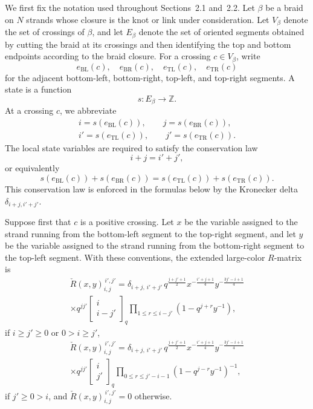 \documentclass[twocolumn]{article}
\begin{document}
We first fix the notation used throughout Sections~2.1 and~2.2.  Let $\beta$ be
a braid on $N$ strands whose closure is the knot or link under consideration.
Let $V_\beta$ denote the set of crossings of $\beta$, and let $E_\beta$ denote
the set of oriented segments obtained by cutting the braid at its crossings and
then identifying the top and bottom endpoints according to the braid closure.
For a crossing $c\in V_\beta$, write
\[
  e_{\mathrm{BL}}(c),\quad e_{\mathrm{BR}}(c),\quad
  e_{\mathrm{TL}}(c),\quad e_{\mathrm{TR}}(c)
\]
for the adjacent bottom-left, bottom-right, top-left, and top-right segments.
A state is a function
\[
  s:E_\beta\to \mathbb Z.
\]
At a crossing $c$, we abbreviate
\[
  \begin{split}
  i=s(e_{\mathrm{BL}}(c)),\qquad
  j=s(e_{\mathrm{BR}}(c)),\\
  i'=s(e_{\mathrm{TL}}(c)),\qquad
  j'=s(e_{\mathrm{TR}}(c)).
  \end{split}
\]
The local state variables are required to satisfy the conservation law
\begin{equation}\label{eq:state-conservation}
  i+j=i'+j',
\end{equation}
or equivalently
\[
  s(e_{\mathrm{BL}}(c))+s(e_{\mathrm{BR}}(c))
  =
  s(e_{\mathrm{TL}}(c))+s(e_{\mathrm{TR}}(c)).
\]
This conservation law is enforced in the formulas below by the Kronecker delta
\(\delta_{i+j,i'+j'}\).

Suppose first that $c$ is a positive crossing.  Let $x$ be the variable assigned
to the strand running from the bottom-left segment to the top-right segment,
and let $y$ be the variable assigned to the strand running from the bottom-right
segment to the top-left segment.  With these conventions, the extended
large-color $R$-matrix is
\begin{multline}\label{eq:positive-rmatrix-1}
\check{R}(x,y)^{\,i',j'}_{i,j}=
\delta_{i+j,\,i'+j'}\,
q^{\frac{j+j'+1}{2}}
 x^{-\frac{i'+j+1}{4}}
 y^{-\frac{3j'-i+1}{4}}
  \\
\times q^{jj'}\begin{bmatrix} i \\ i-j' \end{bmatrix}_q
\prod_{1\le r\le i-j'}\left(1-q^{j+r}y^{-1}\right),
\end{multline}
if \(i\ge j'\ge 0\) or \(0>i\ge j'\),
\begin{multline}\label{eq:positive-rmatrix-2}
\check{R}(x,y)^{\,i',j'}_{i,j}=
\delta_{i+j,\,i'+j'}\,
q^{\frac{j+j'+1}{2}}
 x^{-\frac{i'+j+1}{4}}
 y^{-\frac{3j'-i+1}{4}}
  \\
  \times q^{jj'}\begin{bmatrix} i \\ j' \end{bmatrix}_q
\prod_{0\le r\le j'-i-1}\left(1-q^{j-r}y^{-1}\right)^{-1},
\end{multline}
if \(j'\ge 0>i\), and \(\check{R}(x,y)^{\,i',j'}_{i,j}=0\) otherwise.
\end{document}
